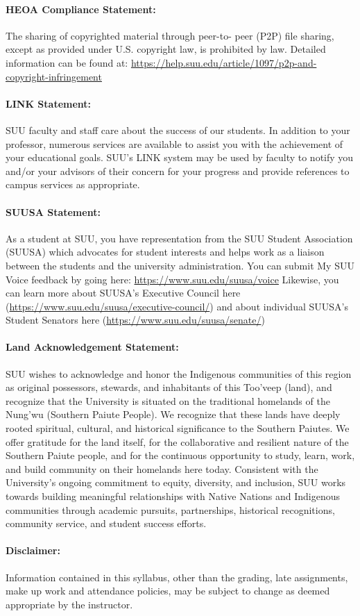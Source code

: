 \documentclass[12pt, letterpaper]{article}
\begin{document}
\paragraph{HEOA Compliance Statement:}
The sharing of copyrighted material through peer-to- peer (P2P) file sharing, except as provided under U.S. copyright law, is prohibited by law. Detailed information can be found at: \href{https://help.suu.edu/article/1097/p2p-and-copyright-infringement}{https://help.suu.edu/article/1097/p2p-and-copyright-infringement}

\paragraph{LINK Statement:}
SUU faculty and staff care about the success of our students. In addition to your professor, numerous services are available to assist you with the achievement of your educational goals. SUU's LINK system may be used by faculty to notify you and/or your advisors of their concern for your progress and provide references to campus services as appropriate.

\paragraph{SUUSA Statement:}
As a student at SUU, you have representation from the SUU Student Association (SUUSA) which advocates for student interests and helps work as a liaison between the students and the university administration. You can submit My SUU Voice feedback by going here: \href{https://www.suu.edu/suusa/voice}{https://www.suu.edu/suusa/voice} Likewise, you can learn more about SUUSA's Executive Council here (\href{https://www.suu.edu/suusa/executive-council/}{https://www.suu.edu/suusa/executive-council/}) and about individual SUUSA's Student Senators here (\href{https://www.suu.edu/suusa/senate/}{https://www.suu.edu/suusa/senate/})

\paragraph{Land Acknowledgement Statement:}
SUU wishes to acknowledge and honor the Indigenous communities of this region as original possessors, stewards, and inhabitants of this Too’veep (land), and recognize that the University is situated on the traditional homelands of the Nung’wu (Southern Paiute People). We recognize that these lands have deeply rooted spiritual, cultural, and historical significance to the Southern Paiutes. We offer gratitude for the land itself, for the collaborative and resilient nature of the Southern Paiute people, and for the continuous opportunity to study, learn, work, and build community on their homelands here today. Consistent with the University's ongoing commitment to equity, diversity, and inclusion, SUU works towards building meaningful relationships with Native Nations and Indigenous communities through academic pursuits, partnerships, historical recognitions, community service, and student success efforts.

\paragraph{Disclaimer:}
Information contained in this syllabus, other than the grading, late assignments, make up work and attendance policies, may be subject to change as deemed appropriate by the instructor.
\end{document}
